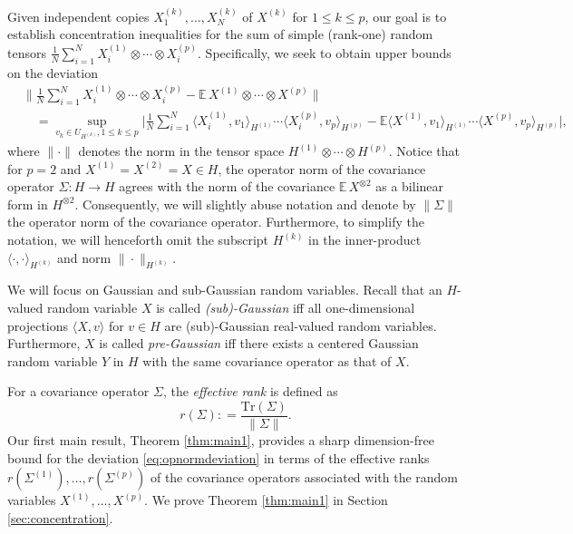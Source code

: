 \documentclass[numbers,webpdf,imaiai]{ima-authoring-template}
\theoremstyle{thmstyletwo}%
\numberwithin{equation}{section}
\numberwithin{equation}{section}
\newcommand{\E}{\mathbb{E}}
\begin{document}
 Given independent copies $X^{(k)}_1, \ldots, X^{(k)}_N$ of $X^{(k)}$ for $1\le k\le p$, our goal is to establish concentration inequalities for the sum of simple (rank-one) random tensors $\frac{1}{N} \sum_{i=1}^N X^{(1)}_i\otimes \cdots \otimes X^{(p)}_i$.   Specifically, we seek to obtain upper bounds on the deviation 
\begin{align}\label{eq:opnormdeviation}
&\bigg\|\frac{1}{N} \sum_{i=1}^N X_i^{(1)} \otimes \cdots \otimes X_i^{(p)}-\E\, X^{(1)} \otimes \cdots \otimes X^{(p)}\bigg\| \nonumber\\
&\quad = \sup_{v_k \in U_{H^{(k)}},1\le k\le p} \bigg| \frac{1}{N}\sum_{i=1}^N \langle X^{(1)}_i,v_1\rangle_{H^{(1)}} \cdots \langle X^{(p)}_i, v_p \rangle_{H^{(p)}}  -  \E\langle X^{(1)},v_1 \rangle_{H^{(1)}} \cdots \langle X^{(p)}, v_p \rangle_{H^{(p)}} \bigg|,
 \end{align}
where $\| \cdot \|$ denotes the norm in the tensor space $H^{(1)}\otimes \cdots \otimes H^{(p)}.$ Notice that for $p=2$ and $X^{(1)}=X^{(2)}=X\in H$, the operator norm of the covariance operator $\Sigma: H \to H$ agrees with the norm of the covariance  $\E \,X^{\otimes 2}$ as a bilinear form in $H^{\otimes 2}.$ Consequently, we will slightly abuse notation and  denote by $\| \Sigma\|$ the operator norm of the covariance operator. Furthermore, to simplify the notation, we will henceforth omit the subscript $H^{(k)}$ in the inner-product $\langle \cdot, \cdot \rangle_{H^{(k)}}$ and norm $\| \cdot \|_{H^{(k)}}$. 

We will focus on Gaussian and sub-Gaussian random variables. Recall that an $H$-valued random variable $X$ is called \emph{(sub)-Gaussian} iff all one-dimensional projections $\langle X, v \rangle$ for $v \in H$ are (sub)-Gaussian real-valued random variables. Furthermore, $X$ is called \emph{pre-Gaussian} iff there exists a centered Gaussian random variable $Y$ in $H$ with the same covariance operator as that of $X.$

For a covariance operator $\Sigma$, the \emph{effective rank} is defined as \[
r(\Sigma): = \frac{\mathrm{Tr}(\Sigma)}{\| \Sigma\|}.
\]
Our first main result, Theorem \ref{thm:main1}, provides a sharp dimension-free bound for the deviation \eqref{eq:opnormdeviation} in terms of the effective ranks  $r(\Sigma^{(1)}),\ldots, r(\Sigma^{(p)})$ of the covariance operators associated with the random variables $X^{(1)},\ldots, X^{(p)}$. We prove Theorem \ref{thm:main1} in Section \ref{sec:concentration}.
\end{document}
